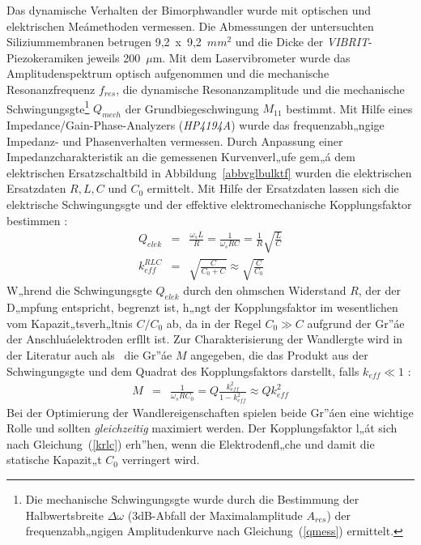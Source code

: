 Das dynamische Verhalten der Bimorphwandler wurde mit optischen und
elektrischen Meámethoden vermessen. Die Abmessungen der untersuchten
Siliziummembranen betrugen 9,2~x~9,2~$mm^{2}$ und die Dicke der
{\sl VIBRIT}-Piezokeramiken jeweils 200~$\mu$m. Mit dem
Laservibrometer wurde das Amplitudenspektrum optisch aufgenommen und die
mechanische Resonanzfrequenz $f_{res}$, die dynamische Resonanzamplitude
und die mechanische Schwingungsgte\footnote{Die mechanische
Schwingungsgte wurde durch die Bestimmung der Halbwertsbreite
$\Delta \omega$ (3dB-Abfall der Maximalamplitude $A_{res}$)
der frequenzabh„ngigen Amplitudenkurve nach Gleichung~(\ref{qmess})
ermittelt.} $Q_{mech}$
der Grundbiegeschwingung $M_{11}$ bestimmt. Mit Hilfe eines
Impedance/Gain-Phase-Analyzers ({\sl HP4194A}) wurde das frequenzabh„ngige
Impedanz- und Phasenverhalten vermessen. Durch Anpassung einer
Impedanzcharakteristik an die gemessenen Kurvenverl„ufe gem„á dem
elektrischen Ersatzschaltbild in Abbildung~\ref{abbvglbulktf} wurden die
elektrischen Ersatzdaten $R, L, C$ und $C_{0}$ ermittelt. Mit Hilfe der
Ersatzdaten lassen sich die elektrische Schwingungsgte und
der effektive elektromechanische Kopplungsfaktor bestimmen \cite{Til93}:
\begin{eqnarray}
\label{qkmelek}
 Q_{elek}       & = & \frac{\omega_{s}L}{R} = \frac{1}{\omega_{s}RC}
                  = \frac{1}{R} \sqrt{\frac{L}{C}} \\
\label{krlc}
 k_{eff}^{RLC}  & = & \sqrt{\frac{C}{C_{0} + C}}
                \approx \sqrt{\frac{C}{C_{0}}}
\end{eqnarray}
W„hrend die Schwingungsgte $Q_{elek}$ durch den ohmschen Widerstand $R$,
der der D„mpfung entspricht, begrenzt ist, h„ngt der Kopplungsfaktor im
wesentlichen
vom Kapazit„tsverh„ltnis $C/C_{0}$ ab, da in der Regel $C_{0} \gg C$
aufgrund der Gr”áe der Anschluáelektroden erfllt ist.
Zur Charakterisierung der Wandlergte wird in der Literatur auch als
\grqq \, die Gr”áe $M$ angegeben, die das Produkt
aus der Schwingungsgte und dem Quadrat des Kopplungsfaktors darstellt,
falls $k_{eff} \ll 1$ \cite{IEEE}:
\begin{eqnarray}
\label{merit}
 M & = & \frac{1}{\omega_{s}RC_{0}}
     = Q \frac{k_{eff}^2}{1 - k_{eff}^2} \approx Q k_{eff}^2
\end{eqnarray}
Bei der Optimierung der Wandlereigenschaften spielen beide Gr”áen eine
wichtige Rolle und sollten {\em gleichzeitig} maximiert werden.
Der Kopplungsfaktor l„át sich nach Gleichung~(\ref{krlc}) erh”hen, wenn die
Elektrodenfl„che und damit die statische Kapazit„t $C_{0}$ verringert wird.
